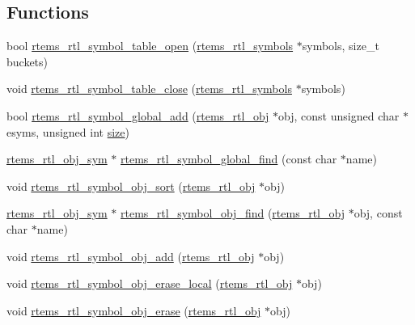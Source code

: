 \subsection*{Functions}
\begin{DoxyCompactItemize}
\item 
bool \mbox{\hyperlink{rtl-sym_8h_a833c85e22a03d0c816411f6b88ea5bbf}{rtems\+\_\+rtl\+\_\+symbol\+\_\+table\+\_\+open}} (\mbox{\hyperlink{structrtems__rtl__symbols}{rtems\+\_\+rtl\+\_\+symbols}} $\ast$symbols, size\+\_\+t buckets)
\item 
void \mbox{\hyperlink{rtl-sym_8h_ac18c51aca9023a082b359e672c8838e6}{rtems\+\_\+rtl\+\_\+symbol\+\_\+table\+\_\+close}} (\mbox{\hyperlink{structrtems__rtl__symbols}{rtems\+\_\+rtl\+\_\+symbols}} $\ast$symbols)
\item 
bool \mbox{\hyperlink{rtl-sym_8h_acfcaf459050499e3ba535d8f17b1cac7}{rtems\+\_\+rtl\+\_\+symbol\+\_\+global\+\_\+add}} (\mbox{\hyperlink{structrtems__rtl__obj}{rtems\+\_\+rtl\+\_\+obj}} $\ast$obj, const unsigned char $\ast$esyms, unsigned int \mbox{\hyperlink{sun4u_2tte_8h_a245260f6f74972558f61b85227df5aae}{size}})
\item 
\mbox{\hyperlink{structrtems__rtl__obj__sym}{rtems\+\_\+rtl\+\_\+obj\+\_\+sym}} $\ast$ \mbox{\hyperlink{rtl-sym_8h_a2e0a774381e2d7d9597a88b1688741d3}{rtems\+\_\+rtl\+\_\+symbol\+\_\+global\+\_\+find}} (const char $\ast$name)
\item 
void \mbox{\hyperlink{rtl-sym_8h_a450818df431a0b6254e933f45497c281}{rtems\+\_\+rtl\+\_\+symbol\+\_\+obj\+\_\+sort}} (\mbox{\hyperlink{structrtems__rtl__obj}{rtems\+\_\+rtl\+\_\+obj}} $\ast$obj)
\item 
\mbox{\hyperlink{structrtems__rtl__obj__sym}{rtems\+\_\+rtl\+\_\+obj\+\_\+sym}} $\ast$ \mbox{\hyperlink{rtl-sym_8h_a98e04c5083c6560c69802ee44b839459}{rtems\+\_\+rtl\+\_\+symbol\+\_\+obj\+\_\+find}} (\mbox{\hyperlink{structrtems__rtl__obj}{rtems\+\_\+rtl\+\_\+obj}} $\ast$obj, const char $\ast$name)
\item 
void \mbox{\hyperlink{rtl-sym_8h_abd7450ebf4df51019720c76de3823460}{rtems\+\_\+rtl\+\_\+symbol\+\_\+obj\+\_\+add}} (\mbox{\hyperlink{structrtems__rtl__obj}{rtems\+\_\+rtl\+\_\+obj}} $\ast$obj)
\item 
void \mbox{\hyperlink{rtl-sym_8h_a02b3a4ba7169bb4f243a5be15b301391}{rtems\+\_\+rtl\+\_\+symbol\+\_\+obj\+\_\+erase\+\_\+local}} (\mbox{\hyperlink{structrtems__rtl__obj}{rtems\+\_\+rtl\+\_\+obj}} $\ast$obj)
\item 
void \mbox{\hyperlink{rtl-sym_8h_adf65b8fa73ea388857082a79e437767a}{rtems\+\_\+rtl\+\_\+symbol\+\_\+obj\+\_\+erase}} (\mbox{\hyperlink{structrtems__rtl__obj}{rtems\+\_\+rtl\+\_\+obj}} $\ast$obj)
\end{DoxyCompactItemize}


